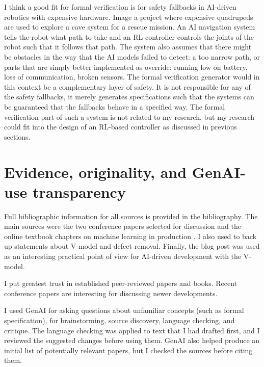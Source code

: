 \documentclass{article}
\begin{document}
I think a good fit for formal verification is for safety fallbacks in AI-driven robotics with expensive hardware. Image a project where expensive quadrupeds are used to explore a cave system for a rescue mission. An AI navigation system tells the robot what path to take and an RL controller controls the joints of the robot such that it follows that path.
The system also assumes that there might be obstacles in the way that the AI models failed to detect: a too narrow path, 
or parts that are simply better implemented as override: running low on battery, loss of communication, broken sensors.
The formal verification generator would in this context be a complementary layer of safety. It is not responsible for any of the safety fallbacks, it merely generates specifications such that the systems can be guaranteed that the fallbacks behave in a specified way.
The formal verification part of such a system is not related to my research, but my research could fit into the design of an RL-based controller as discussed in previous sections.

\section{Evidence, originality, and GenAI-use transparency}
Full bibliographic information for all sources is provided in the bibliography. The main sources were the two conference papers selected for discussion \cite{ayon2026autorespec,ntentos2026agentic} and the online textbook chapters on machine learning in production \cite{kastner2025machine}.
I also used \cite{forsberg1991relationship,boehm2001software} to back up statements about V-model and defect removal. Finally, the blog post \cite{kfir2026vmodel} was used as an interesting practical point of view for AI-driven development with the V-model.

I put greatest trust in established peer-reviewed papers and books. Recent conference papers are interesting for discussing newer developments.

I used GenAI for asking questions about unfamiliar concepts (such as formal specification), for brainstorming, source discovery, language checking, and critique.
The language checking was applied to text that I had drafted first, and I reviewed the suggested changes before using them.
GenAI also helped produce an initial list of potentially relevant papers, but I checked the sources before citing them.

\printbibliography
\end{document}
